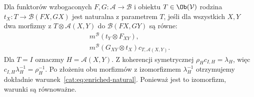 \begin{definicja}\label{cat:def:parameter-natural}
Dla funktorów wzbogaconych $F,G:\mathcal A\to\mathcal B$ i obiektu $T\in\Ob(\mathcal V)$ rodzina $t_X:T\to\mathcal B(FX,GX)$ jest naturalna z parametrem $T$, jeśli dla wszystkich $X,Y$ dwa morfizmy z $T\otimes\mathcal A(X,Y)$ do $\mathcal B(FX,GY)$ są równe:
\[
 \begin{aligned}
 &m^{\mathcal B}(t_Y\otimes F_{XY}),\\
 &m^{\mathcal B}(G_{XY}\otimes t_X)c_{T,\mathcal A(X,Y)}.
 \end{aligned}
\]
Dla $T=I$ oznaczmy $H=\mathcal A(X,Y)$. Z koherencji symetrycznej $\rho_Hc_{I,H}=\lambda_H$, więc $c_{I,H}\lambda_H^{-1}=\rho_H^{-1}$. Po złożeniu obu morfizmów z izomorfizmem $\lambda_H^{-1}$ otrzymujemy dokładnie warunek~\eqref{cat:eq:enriched-natural}. Ponieważ jest to izomorfizm, warunki są równoważne.
\end{definicja}

